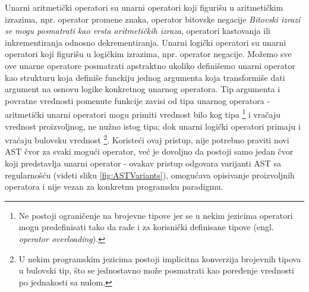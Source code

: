 Unarni aritmetički operatori su unarni operatori koji figurišu u aritmetičkim izrazima, npr. operator promene znaka, operator bitovske negacije \emph{Bitovski izrazi se mogu posmatrati kao vrsta aritmetičkih izraza}, operatori kastovanja ili inkrementiranja odnosno dekrementiranja. Unarni logički operatori su unarni operatori koji figurišu u logičkim izrazima, npr. operator negacije. Možemo sve ove unarne operatore posmatrati apstraktno ukoliko definišemo unarni operator kao strukturu koja definiše funckiju jednog argumenta koja transformiše dati argument na osnovu logike konkretnog unarnog operatora. Tip argumenta i povratne vrednosti pomenute funkcije zavisi od tipa unarnog operatora - aritmetički unarni operatori mogu primiti vrednost bilo kog tipa \footnote{Ne postoji ograničenje na brojevne tipove jer se u nekim jezicima operatori mogu predefinisati tako da rade i za korisnički definisane tipove (engl. \emph{operator overloading}).} i vračaju vrednost proizvoljnog, ne nužno istog tipa; dok unarni logički operatori primaju i vraćaju bulovsku vrednost \footnote{U nekim programskim jezicima postoji implicitna konverzija brojevnih tipova u bulovski tip, što se jednostavno može posmatrati kao poređenje vrednosti po jednakosti sa nulom.}. Koristeći ovaj pristup, nije potrebno praviti novi AST čvor za svaki mogući operator, već je dovoljno da postoji samo jedan čvor koji predstavlja unarni operator - ovakav pristup odgovara varijanti AST sa regularnošću (videti sliku \ref{fig:ASTVariants}), omogućava opisivanje proizvoljnih operatora i nije vezan za konkretnu programsku paradigmu.

